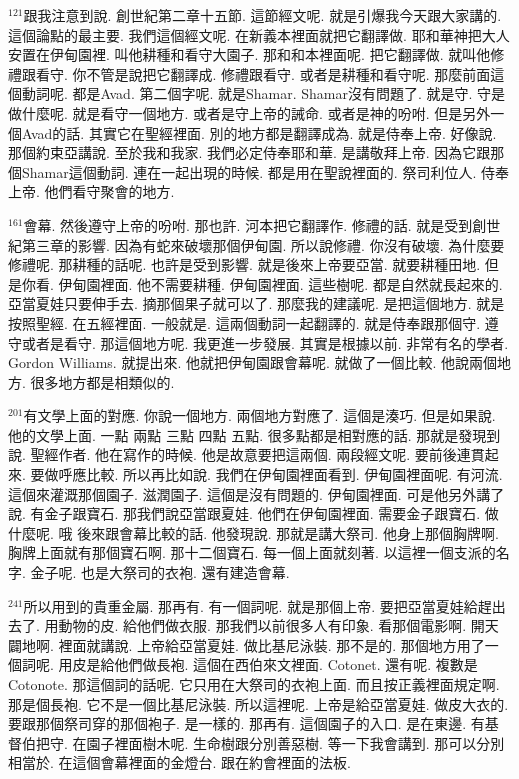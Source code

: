 \documentclass{book}
\begin{document}
$^{121}$跟我注意到說.
創世紀第二章十五節.
這節經文呢.
就是引爆我今天跟大家講的.
這個論點的最主要.
我們這個經文呢.
在新義本裡面就把它翻譯做.
耶和華神把大人安置在伊甸園裡.
叫他耕種和看守大園子.
那和和本裡面呢.
把它翻譯做.
就叫他修禮跟看守.
你不管是說把它翻譯成.
修禮跟看守.
或者是耕種和看守呢.
那麼前面這個動詞呢.
都是Avad.
第二個字呢.
就是Shamar.
Shamar沒有問題了.
就是守.
守是做什麼呢.
就是看守一個地方.
或者是守上帝的誡命.
或者是神的吩咐.
但是另外一個Avad的話.
其實它在聖經裡面.
別的地方都是翻譯成為.
就是侍奉上帝.
好像說.
那個約束亞講說.
至於我和我家.
我們必定侍奉耶和華.
是講敬拜上帝.
因為它跟那個Shamar這個動詞.
連在一起出現的時候.
都是用在聖說裡面的.
祭司利位人.
侍奉上帝.
他們看守聚會的地方.

$^{161}$會幕.
然後遵守上帝的吩咐.
那也許.
河本把它翻譯作.
修禮的話.
就是受到創世紀第三章的影響.
因為有蛇來破壞那個伊甸園.
所以說修禮.
你沒有破壞.
為什麼要修禮呢.
那耕種的話呢.
也許是受到影響.
就是後來上帝要亞當.
就要耕種田地.
但是你看.
伊甸園裡面.
他不需要耕種.
伊甸園裡面.
這些樹呢.
都是自然就長起來的.
亞當夏娃只要伸手去.
摘那個果子就可以了.
那麼我的建議呢.
是把這個地方.
就是按照聖經.
在五經裡面.
一般就是.
這兩個動詞一起翻譯的.
就是侍奉跟那個守.
遵守或者是看守.
那這個地方呢.
我更進一步發展.
其實是根據以前.
非常有名的學者.
Gordon Williams.
就提出來.
他就把伊甸園跟會幕呢.
就做了一個比較.
他說兩個地方.
很多地方都是相類似的.

$^{201}$有文學上面的對應.
你說一個地方.
兩個地方對應了.
這個是湊巧.
但是如果說.
他的文學上面.
一點 兩點 三點 四點 五點.
很多點都是相對應的話.
那就是發現到說.
聖經作者.
他在寫作的時候.
他是故意要把這兩個.
兩段經文呢.
要前後連貫起來.
要做呼應比較.
所以再比如說.
我們在伊甸園裡面看到.
伊甸園裡面呢.
有河流.
這個來灌溉那個園子.
滋潤園子.
這個是沒有問題的.
伊甸園裡面.
可是他另外講了說.
有金子跟寶石.
那我們說亞當跟夏娃.
他們在伊甸園裡面.
需要金子跟寶石.
做什麼呢.
哦 後來跟會幕比較的話.
他發現說.
那就是講大祭司.
他身上那個胸牌啊.
胸牌上面就有那個寶石啊.
那十二個寶石.
每一個上面就刻著.
以這裡一個支派的名字.
金子呢.
也是大祭司的衣袍.
還有建造會幕.

$^{241}$所以用到的貴重金屬.
那再有.
有一個詞呢.
就是那個上帝.
要把亞當夏娃給趕出去了.
用動物的皮.
給他們做衣服.
那我們以前很多人有印象.
看那個電影啊.
開天闢地啊.
裡面就講說.
上帝給亞當夏娃.
做比基尼泳裝.
那不是的.
那個地方用了一個詞呢.
用皮是給他們做長袍.
這個在西伯來文裡面.
Cotonet.
還有呢.
複數是Cotonote.
那這個詞的話呢.
它只用在大祭司的衣袍上面.
而且按正義裡面規定啊.
那是個長袍.
它不是一個比基尼泳裝.
所以這裡呢.
上帝是給亞當夏娃.
做皮大衣的.
要跟那個祭司穿的那個袍子.
是一樣的.
那再有.
這個園子的入口.
是在東邊.
有基督伯把守.
在園子裡面樹木呢.
生命樹跟分別善惡樹.
等一下我會講到.
那可以分別相當於.
在這個會幕裡面的金燈台.
跟在約會裡面的法板.
\end{document}
